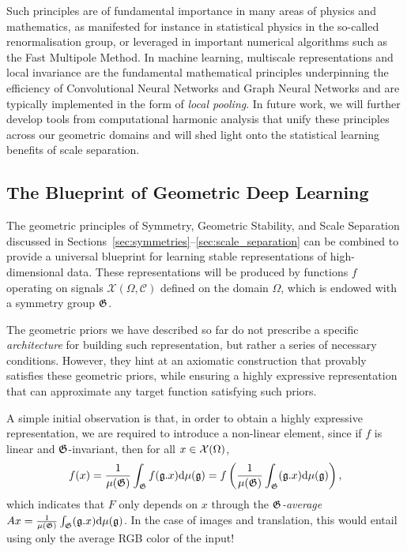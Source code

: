 Such principles are of fundamental importance in many areas of physics and mathematics, as manifested for instance in statistical physics in the so-called renormalisation group, or leveraged in important numerical algorithms such as the Fast Multipole Method. In machine learning, multiscale representations and local invariance are the fundamental mathematical principles underpinning the efficiency of Convolutional Neural Networks and Graph Neural Networks and are typically implemented in the form of {\em local pooling}. In future work, we will further develop tools from computational harmonic analysis that unify these principles across our geometric domains and will shed light onto the statistical learning benefits of scale separation. 





\subsection{The Blueprint of Geometric Deep Learning}
\label{sec:gdl_blueprint}

The geometric principles of Symmetry, Geometric Stability, and Scale Separation discussed in Sections~\ref{sec:symmetries}--\ref{sec:scale_separation} can be combined to provide a universal blueprint for learning stable representations of high-dimensional data. 
%
These representations will be produced by functions $f$ operating on signals $\mathcal{X}(\Omega,\mathcal{C})$ defined on the domain $\Omega$, which is endowed with a symmetry group ${\mathfrak{G}}$. 


The geometric priors we have described so far do not prescribe a specific {\em architecture} for building such representation, but rather a series of necessary conditions. 
However, they hint at an axiomatic construction that provably satisfies these geometric priors, while ensuring a highly expressive representation that can approximate any target function satisfying such priors. %


A simple initial observation is that, in order to obtain a highly expressive representation, we are required to introduce a non-linear element, since
if $f$ is linear and ${\mathfrak{G}}$-invariant, then for all $x \in {\mathcal{X}}(\Omega)$, 
$$
f(x) =  \frac{1}{\mu({\mathfrak{G}})} \int_{{\mathfrak{G}}} f( {\mathfrak{g}}. x) \mathrm{d}\mu({\mathfrak{g}}) = f\left(\frac{1}{\mu({\mathfrak{G}})} \int_{{\mathfrak{G}}} ({\mathfrak{g}}.x) \mathrm{d}\mu({\mathfrak{g}}) \right),
$$
which indicates that $F$ only depends on $x$ through the  \emph{${\mathfrak{G}}$-average} $A{x} = \frac{1}{\mu({\mathfrak{G}})} \int_{{\mathfrak{G}}} ({\mathfrak{g}}.x) \mathrm{d}\mu({\mathfrak{g}})$. In the case of images and translation, this would entail using only the average RGB color of the input! %


